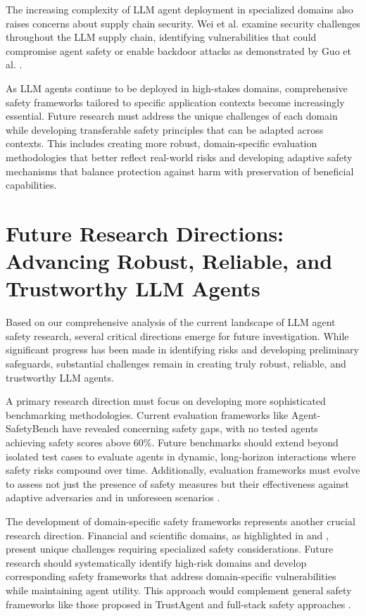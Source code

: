 \documentclass[conference]{IEEEtran}
\begin{document}
The increasing complexity of LLM agent deployment in specialized domains also raises concerns about supply chain security. Wei et al. \cite{2411.01604} examine security challenges throughout the LLM supply chain, identifying vulnerabilities that could compromise agent safety or enable backdoor attacks as demonstrated by Guo et al. \cite{2402.11208}.

As LLM agents continue to be deployed in high-stakes domains, comprehensive safety frameworks tailored to specific application contexts become increasingly essential. Future research must address the unique challenges of each domain while developing transferable safety principles that can be adapted across contexts. This includes creating more robust, domain-specific evaluation methodologies that better reflect real-world risks and developing adaptive safety mechanisms that balance protection against harm with preservation of beneficial capabilities.



\section{Future Research Directions: Advancing Robust, Reliable, and Trustworthy LLM Agents}

Based on our comprehensive analysis of the current landscape of LLM agent safety research, several critical directions emerge for future investigation. While significant progress has been made in identifying risks and developing preliminary safeguards, substantial challenges remain in creating truly robust, reliable, and trustworthy LLM agents.

A primary research direction must focus on developing more sophisticated benchmarking methodologies. Current evaluation frameworks like Agent-SafetyBench \cite{2412.14470} have revealed concerning safety gaps, with no tested agents achieving safety scores above 60\%. Future benchmarks should extend beyond isolated test cases to evaluate agents in dynamic, long-horizon interactions where safety risks compound over time. Additionally, evaluation frameworks must evolve to assess not just the presence of safety measures but their effectiveness against adaptive adversaries and in unforeseen scenarios \cite{2410.02644}.

The development of domain-specific safety frameworks represents another crucial research direction. Financial and scientific domains, as highlighted in \cite{2502.15865} and \cite{2402.04247}, present unique challenges requiring specialized safety considerations. Future research should systematically identify high-risk domains and develop corresponding safety frameworks that address domain-specific vulnerabilities while maintaining agent utility. This approach would complement general safety frameworks like those proposed in TrustAgent \cite{2402.01586} and full-stack safety approaches \cite{2504.15585}.
\end{document}
